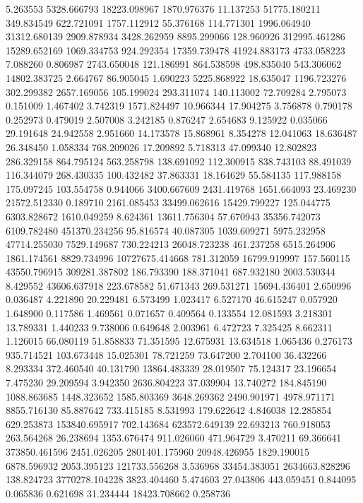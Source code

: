 5.263553
5328.666793
18223.098967
1870.976376
11.137253
51775.180211
349.834549
622.721091
1757.112912
55.376168
114.771301
1996.064940
31312.680139
2909.878934
3428.262959
8895.299066
128.960926
312995.461286
15289.652169
1069.334753
924.292354
17359.739478
41924.883173
4733.058223
7.088260
0.806987
2743.650048
121.186991
864.538598
498.835040
543.306062
14802.383725
2.664767
86.905045
1.690223
5225.868922
18.635047
1196.723276
302.299382
2657.169056
105.199024
293.311074
140.113002
72.709284
2.795073
0.151009
1.467402
3.742319
1571.824497
10.966344
17.904275
3.756878
0.790178
0.252973
0.479019
2.507008
3.242185
0.876247
2.654683
9.125922
0.035066
29.191648
24.942558
2.951660
14.173578
15.868961
8.354278
12.041063
18.636487
26.348450
1.058334
768.209026
17.209892
5.718313
47.099340
12.802823
286.329158
864.795124
563.258798
138.691092
112.300915
838.743103
88.491039
116.344079
268.430335
100.432482
37.863331
18.164629
55.584135
117.988158
175.097245
103.554758
0.944066
3400.667609
2431.419768
1651.664093
23.469230
21572.512330
0.189710
2161.085453
33499.062616
15429.799227
125.044775
6303.828672
1610.049259
8.624361
13611.756304
57.670943
35356.742073
6109.782480
451370.234256
95.816574
40.087305
1039.609271
5975.232958
47714.255030
7529.149687
730.224213
26048.723238
461.237258
6515.264906
1861.174561
8829.734996
10727675.414668
781.312059
16799.919997
157.560115
43550.796915
309281.387802
186.793390
188.371041
687.932180
2003.530344
8.429552
43606.637918
223.678582
51.671343
269.531271
15694.436401
2.650996
0.036487
4.221890
20.229481
6.573499
1.023417
6.527170
46.615247
0.057920
1.648900
0.117586
1.469561
0.071657
0.409564
0.133554
12.081593
3.218301
13.789331
1.440233
9.738006
0.649648
2.003961
6.472723
7.325425
8.662311
1.126015
66.080119
51.858833
71.351595
12.675931
13.634518
1.065436
0.276173
935.714521
103.673448
15.025301
78.721259
73.647200
2.704100
36.432266
8.293334
372.460540
40.131790
13864.483339
28.019507
75.124317
23.196654
7.475230
29.209594
3.942350
2636.804223
37.039904
13.740272
184.845190
1088.863685
1448.323652
1585.803369
3648.269362
2490.901971
4978.971171
8855.716130
85.887642
733.415185
8.531993
179.622642
4.846038
12.285854
629.253873
153840.695917
702.143684
623572.649139
22.693213
760.918053
263.564268
26.238694
1353.676474
911.026060
471.964729
3.470211
69.366641
373850.461596
2451.026205
2801401.175960
20948.426955
1829.190015
6878.596932
2053.395123
121733.556268
3.536968
33454.383051
2634663.828296
138.824723
3770278.104228
3823.404460
5.474603
27.043806
443.059451
0.844095
0.065836
0.621698
31.234444
18423.708662
0.258736
